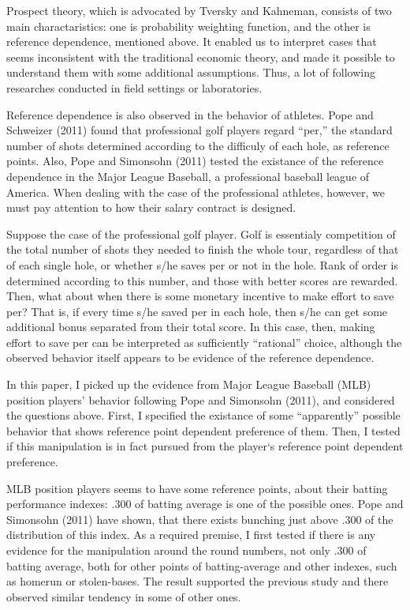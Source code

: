 \documentclass[dvipdfmx, 12pt]{article}
\begin{document}
Prospect theory, which is advocated by Tversky and Kahneman, consists of two main charactaristics: one is probability weighting function, and the other is reference dependence, mentioned above. It enabled us to interpret cases that seems inconsistent with the traditional economic theory, and made it possible to understand them with some additional assumptions. Thus, a lot of following researches conducted in field settings or laboratories.

Reference dependence is also observed in the behavior of athletes. Pope and Schweizer (2011) found that professional golf players regard ``per,'' the standard number of shots determined according to the difficuly of each hole, as reference points. Also, Pope and Simonsohn (2011) tested the existance of the reference dependence in the Major League Baseball, a professional baseball league of America.  When dealing with the case of the professional athletes, however, we must pay attention to how their salary contract is designed.

Suppose the case of the professional golf player. Golf is essentialy competition of the total number of shots they needed to finish the whole tour, regardless of that of each single hole, or whether s/he saves per or not in the hole. Rank of order is determined according to this number, and those with better scores are rewarded. Then, what about when there is some monetary incentive to make effort to save per? That is, if every time s/he saved per in each hole, then s/he can get some additional bonus separated from their total score. In this case, then, making effort to save per can be interpreted as sufficiently ``rational'' choice, although the observed behavior itself appears to be evidence of the reference dependence.

In this paper, I picked up the evidence from Major League Baseball (MLB) position players' behavior following Pope and Simonsohn (2011), and considered the questions above. First, I specified the existance of some ``apparently'' possible behavior that shows reference point dependent preference of them. Then, I tested if this manipulation is in fact pursued from the player`s reference point dependent preference.

MLB position players seems to have some reference points, about their batting performance indexes: .300 of batting average is one of the possible ones. Pope and Simonsohn (2011) have shown, that there exists bunching just above .300 of the distribution of this index. As a required premise, I first tested if there is any evidence for the manipulation around the round numbers, not only .300 of batting average, both for other points of batting-average and other indexes, such as homerun or stolen-bases. The result supported the previous study and there observed similar tendency in some of other ones.
\end{document}
